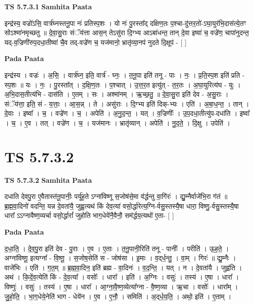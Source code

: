\documentclass[17pt]{extarticle}
\begin{document}
\textbf{TS 5.7.3.1 } \newline
\textbf{Samhita Paata} \newline

इन्द्र॑स्य॒ वज्रो॑ऽसि॒ वार्त्र॑घ्नस्तनू॒पा नः॑ प्रतिस्प॒शः । यो नः॑ पु॒रस्ता᳚द् दक्षिण॒तः प॒श्चा-दु॑त्तर॒तो॑-ऽघा॒युर॑भि॒दास॑त्ये॒तꣳ सोऽश्मा॑नमृच्छतु ॥ दे॒वा॒सु॒राः संॅय॑त्ता आस॒न् तेऽसु॑रा दि॒ग्भ्य आऽबा॑धन्त॒ तान् दे॒वा इष्वा॑ च॒ वज्रे॑ण॒ चापा॑नुदन्त॒ यद्-व॒ज्रिणी॑रुप॒दधा॒तीष्वा॑ चै॒व तद्-वज्रे॑ण च॒ यज॑मानो॒ भ्रातृ॑व्या॒नप॑ नुदते दि॒क्षूप॑ - [  ] \newline

\textbf{Pada Paata} \newline

इन्द्र॑स्य । वज्रः॑ । अ॒सि॒ । वार्त्र॑घ्न॒ इति॒ वार्त्र॑ - घ्नः॒ । त॒नू॒पा इति॑ तनू - पाः । नः॒ । प्र॒ति॒स्प॒श इति॑ प्रति - स्प॒शः ॥ यः । नः॒ । पु॒रस्ता᳚त् । द॒क्षि॒ण॒तः । प॒श्चात् । उ॒त्त॒र॒त इत्यु॑त् - त॒र॒तः । अ॒घा॒युरित्य॑घ - युः । अ॒भि॒दास॒तीत्य॑भि - दास॑ति । ए॒तम् । सः । अश्मा॑नम् । ऋ॒च्छ॒तु॒ ॥ दे॒वा॒सु॒रा इति॑ देव - अ॒सु॒राः । संॅय॑त्ता॒ इति॒ सं - य॒त्ताः॒ । आ॒स॒न्न् । ते । असु॑राः । दि॒ग्भ्य इति॑ दिक्-भ्यः । एति॑ । अ॒बा॒ध॒न्त॒ । तान् । दे॒वाः । इष्वा᳚ । च॒ । वज्रे॑ण । च॒ । अपेति॑ । अ॒नु॒द॒न्त॒ । यत् । व॒ज्रिणीः᳚ । उ॒प॒दधा॒तीत्यु॑प-दधा॑ति । इष्वा᳚ । च॒ । ए॒व । तत् । वज्रे॑ण । च॒ । यज॑मानः । भ्रातृ॑व्यान् । अपेति॑ । नु॒द॒ते॒ । दि॒क्षु । उपेति॑ ।  \newline





\section{ TS 5.7.3.2 }

\textbf{TS 5.7.3.2 } \newline
\textbf{Samhita Paata} \newline

दधाति देवपु॒रा ए॒वैतास्त॑नू॒पानीः॒ पर्यू॑ह॒ते ऽग्ना॑विष्णू स॒जोष॑से॒मा व॑र्द्धन्तु वा॒गिंरः॑ । द्यु॒म्नैर्वाजे॑भि॒रा ग॑तं ॥ ब्र॒ह्म॒वा॒दिनो॑ वदन्ति॒ यन्न दे॒वता॑यै॒ जुह्व॒त्यथ॑ किं देव॒त्या॑ वसो॒र्द्धारेत्य॒ग्नि-र्वसु॒स्तस्यै॒षा धारा॒ विष्णु॒-र्वसु॒स्तस्यै॒षा धारा᳚ ऽऽग्नावैष्ण॒व्यर्चा वसो॒र्द्धारां᳚ जुहोति भाग॒धेये॑नै॒वैनौ॒ सम॑र्द्धय॒त्यथो॑ ए॒ता- [  ] \newline

\textbf{Pada Paata} \newline

द॒धा॒ति॒ । दे॒व॒पु॒रा इति॑ देव - पु॒राः । ए॒व । ए॒ताः । त॒नू॒पानी॒रिति॑ तनू - पानीः᳚ । परीति॑ । ऊ॒ह॒ते॒ । अग्ना॑विष्णू॒ इत्यग्ना᳚ - वि॒ष्णू॒ । स॒जोष॒सेति॑ स - जोष॑सा । इ॒माः । व॒द्‌र्ध॒न्तु॒ । वा॒म् । गिरः॑ ॥ द्यु॒म्नैः । वाजे॑भिः । एति॑ । ग॒त॒म् ॥ ब्र॒ह्म॒वा॒दिन॒ इति॑ ब्रह्म - वा॒दिनः॑ । व॒द॒न्ति॒ । यत् । न । दे॒वता॑यै । जुह्व॑ति । अथ॑ । कि॒दें॒व॒त्येति॑ किं - दे॒व॒त्या᳚ । वसोः᳚ । धारा᳚ । इति॑ । अ॒ग्निः । वसुः॑ । तस्य॑ । ए॒षा । धारा᳚ । विष्णुः॑ । वसुः॑ । तस्य॑ । ए॒षा । धारा᳚ । आ॒ग्ना॒वै॒ष्ण॒व्येत्या᳚ग्ना - वै॒ष्ण॒व्या । ऋ॒चा । वसोः᳚ । धारा᳚म् । जु॒हो॒ति॒ । भा॒ग॒धेये॒नेति॑ भाग - धेये॑न । ए॒व । ए॒नौ॒ । समिति॑ । अ॒द्‌र्ध॒य॒ति॒ । अथो॒ इति॑ । ए॒ताम् ।  \newline
\end{document}
